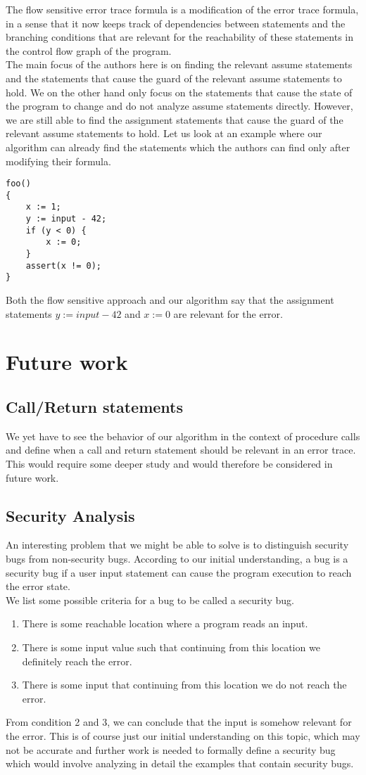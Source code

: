 \documentclass{article}
\begin{document}
The flow sensitive error trace formula is a modification of the error trace formula, in a sense that it now keeps track of dependencies between statements and the branching conditions that are relevant for the reachability of these statements in the control flow graph of the program. \\
The main focus of the authors here is on finding the relevant assume statements and the statements that cause the guard of the relevant assume statements to hold. We on the other hand only focus on the statements that cause the state of the program to change and do not analyze assume statements directly. However, we are still able to find the assignment statements that cause the guard of the relevant assume statements to hold. Let us look at an example where our algorithm can already find the statements which the authors can find only after modifying their formula. 
\begin{lstlisting}
foo()
{
	x := 1;
	y := input - 42;
	if (y < 0) {
		x := 0;	
	}
	assert(x != 0);
}
\end{lstlisting}
Both the flow sensitive approach and our algorithm say that the assignment statements $y := input - 42$ and $x := 0$ are relevant for the error.
\section{Future work}
\subsection{Call/Return statements}
We yet have to see the behavior of our algorithm in the context of procedure calls and define when a call and return statement should be relevant in an error trace. This would require some deeper study and would therefore be considered in future work.
\subsection{Security Analysis}
An interesting problem that we might be able to solve is to distinguish security bugs from non-security bugs. According to our initial understanding, a bug is a security bug if a user input statement can cause the program execution to reach the error state. \\
We list some possible criteria for a bug to be called a security bug.
\begin{enumerate}
  \item There  is some reachable location where a program reads an input.
  \item There is some input value such that continuing from this location we definitely reach the error.
  \item There is some input that continuing from this location we do not reach the error.
\end{enumerate}
From condition 2 and 3, we can conclude that the input is somehow relevant for the error. This is of course just our initial understanding on this topic, which may not be accurate and further work is needed to formally define a security bug which would involve analyzing in detail the examples that contain security bugs.
\newpage


\end{document}
